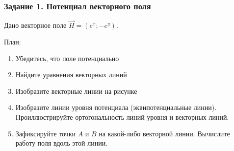 \begin{frame}\frametitle{Задание 1. Потенциал векторного поля}
  Дано векторное поле \( \vec H = \left( e^x; -e^y \right) \).

План:
\begin{enumerate}
  \item Убедитесь, что поле потенциально
  \item Найдите уравнения векторных линий
  \item Изобразите векторные линии на рисунке
  \item Изобразите линии уровня потенциала (эквипотенциальные линии).
  Проиллюстрируйте ортогональность линий уровня и векторных линий.
  \item Зафиксируйте точки \( A \) и \( B \) на какой-либо векторной линии.
  Вычислите работу поля вдоль этой линии.
\end{enumerate}
\end{frame}







